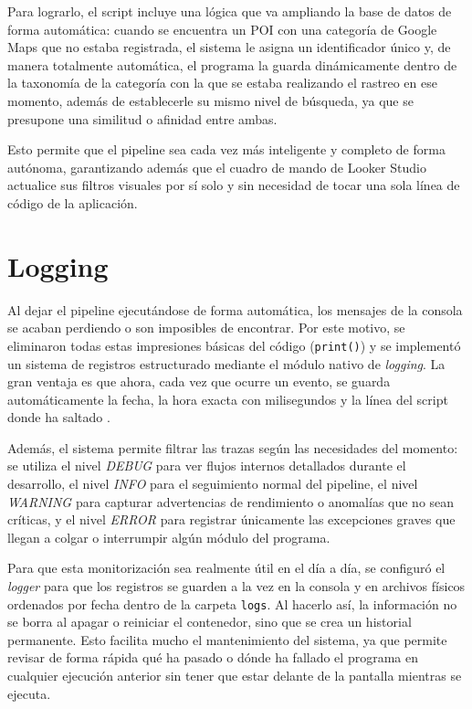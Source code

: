 Para lograrlo, el script incluye una lógica que va ampliando la base de datos de forma automática: cuando se encuentra un POI con una categoría de Google Maps que no estaba registrada, el sistema le asigna un identificador único y, de manera totalmente automática, el programa la guarda dinámicamente dentro de la taxonomía de la categoría con la que se estaba realizando el rastreo en ese momento, además de establecerle su mismo nivel de búsqueda, ya que se presupone una similitud o afinidad entre ambas. 

Esto permite que el pipeline sea cada vez más inteligente y completo de forma autónoma, garantizando además que el cuadro de mando de Looker Studio actualice sus filtros visuales por sí solo y sin necesidad de tocar una sola línea de código de la aplicación.

\section{Logging}
Al dejar el pipeline ejecutándose de forma automática, los mensajes de la consola se acaban perdiendo o son imposibles de encontrar. Por este motivo, se eliminaron todas estas impresiones básicas del código (\texttt{print()}) y se implementó un sistema de registros estructurado mediante el módulo nativo de \textit{logging}. La gran ventaja es que ahora, cada vez que ocurre un evento, se guarda automáticamente la fecha, la hora exacta con milisegundos y la línea del script donde ha saltado \cite{python_logging_howto}. 

Además, el sistema permite filtrar las trazas según las necesidades del momento: se utiliza el nivel \textit{DEBUG} para ver flujos internos detallados durante el desarrollo, el nivel \textit{INFO} para el seguimiento normal del pipeline, el nivel \textit{WARNING} para capturar advertencias de rendimiento o anomalías que no sean críticas, y el nivel \textit{ERROR} para registrar únicamente las excepciones graves que llegan a colgar o interrumpir algún módulo del programa.

Para que esta monitorización sea realmente útil en el día a día, se configuró el \textit{logger} para que los registros se guarden a la vez en la consola y en archivos físicos ordenados por fecha dentro de la carpeta \texttt{logs}. Al hacerlo así, la información no se borra al apagar o reiniciar el contenedor, sino que se crea un historial permanente. Esto facilita mucho el mantenimiento del sistema, ya que permite revisar de forma rápida qué ha pasado o dónde ha fallado el programa en cualquier ejecución anterior sin tener que estar delante de la pantalla mientras se ejecuta.

